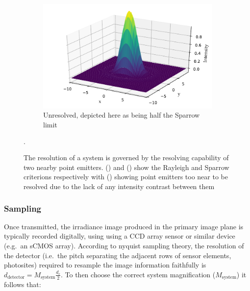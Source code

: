     \begin{figure}
\ContinuedFloat\begin{subfigure}[b]{\textwidth}
        \includegraphics{+airy_too_close}
        \caption{Unresolved, depicted here as being half the Sparrow limit}\label{fig:airy_too_close}
    \end{subfigure}
    \caption[Resolution criterion]{The resolution of a system is governed by the resolving capability of two nearby point emitters.
    () and () show the Rayleigh and Sparrow criterions respectively with () showing point emitters too near to be resolved due to the lack of any intensity contrast between them}\label{fig:airy_disk_resolution}.
\end{figure}

%

\subsubsection{Sampling}


Once transmitted, the irradiance image produced in the primary image plane is typically recorded digitally, using using a \gls{CCD} array sensor or similar device (e.g.~an \gls{sCMOS} array).
According to \Gls{nyquist sampling theory}, the resolution of the detector (i.e.~the pitch separating the adjacent rows of sensor elements, \gls{photosite}s) required to resample the image information faithfully is \(d_\text{detector} =   M_\text{system}\frac{d_r}{2}\).
To then choose the correct system magnification (\(M_\text{system}\)) it follows that:

